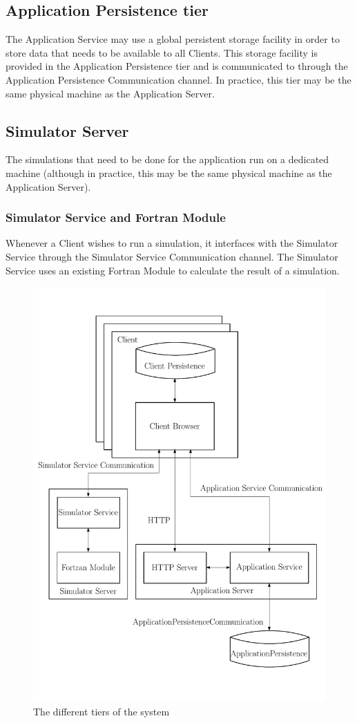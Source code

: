 \subsection{Application Persistence tier}
\label{sec:applicationpersistence}
The Application Service may use a global persistent storage facility in order to store data that needs to be available to all Clients. This storage facility is provided in the Application Persistence tier and is communicated to through the Application Persistence Communication channel. In practice, this tier may be the same physical machine as the Application Server.

\subsection{Simulator Server}
\label{sec:simulatorserver}
The simulations that need to be done for the application run on a dedicated machine (although in practice, this may be the same physical machine as the Application Server).

\subsubsection{Simulator Service and Fortran Module}
\label{sec:simulatorservice}
Whenever a Client wishes to run a simulation, it interfaces with the Simulator Service through the Simulator Service Communication channel. The Simulator Service uses an existing Fortran Module to calculate the result of a simulation.

\begin{figure}
\label{fig:tierchannel}
  \centering
\includegraphics[scale=0.5]{SoftwareTiers}
\caption{The different tiers of the system}
\end{figure}
